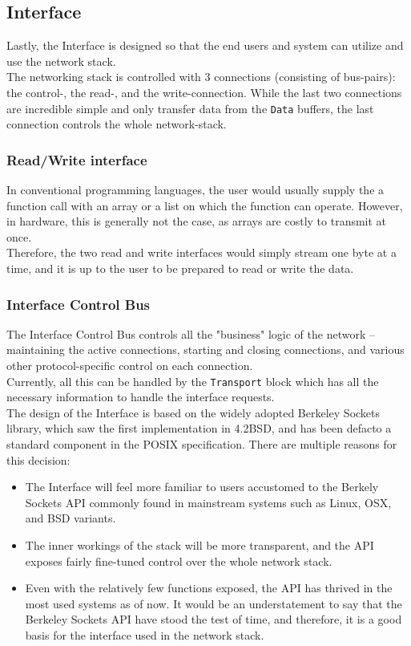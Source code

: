 \subsection{Interface}
Lastly, the Interface is designed so that the end users and system can utilize
and use the network stack.\\
The networking stack is controlled with 3 connections (consisting of bus-pairs): 
the control-, the read-, and the write-connection. While the last two connections 
are incredible simple and only transfer data from the \texttt{Data} buffers, 
the last connection controls the whole network-stack.

\subsubsection{Read/Write interface}
In conventional programming languages, the user would usually supply the a 
function call with an array or a list on which the function can operate.
However, in hardware, this is generally not the case, as arrays are costly to 
transmit at once.\\
Therefore, the two read and write interfaces would simply stream one byte at a 
time, and it is up to the user to be prepared to read or write the data.


\subsubsection{Interface Control Bus}
The Interface Control Bus controls all the "business" logic of the network -- 
maintaining the active connections, starting and closing connections, and various
other protocol-specific control on each connection.\\ 
Currently, all this can be handled by the \texttt{Transport} block which has all 
the necessary information to handle the interface requests.\\
The design of the Interface is based on the widely adopted Berkeley Sockets library,
which saw the first implementation in 4.2BSD, and has been defacto a standard 
component in the POSIX specification\cite{tcpip_illustrated_vol2}. There are 
multiple reasons for this decision:
\begin{itemize}
\item The Interface will feel more familiar to users accustomed to the Berkely 
Sockets API commonly found in mainstream systems such as Linux, OSX, and BSD 
variants.

\item The inner workings of the stack will be more transparent, and the API 
exposes fairly fine-tuned control over the whole network stack.

\item Even with the relatively few functions exposed, the API
has thrived in the most used systems as of now. It would be an understatement to 
say that the Berkeley Sockets API have stood the test of time, and therefore, it
is a good basis for the interface used in the network stack.

\end{itemize}

